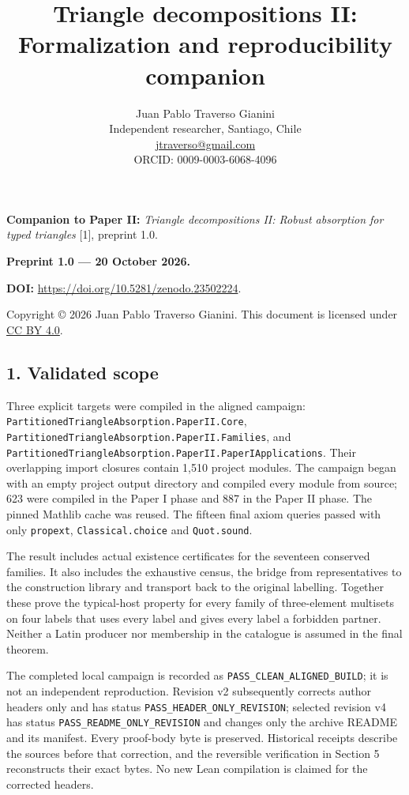 \documentclass[english,11pt,a4paper]{article}
\title{Triangle decompositions II: Formalization and reproducibility companion}
\author{Juan Pablo Traverso Gianini\\
\small Independent researcher, Santiago, Chile\\
\small \href{mailto:jtraverso@gmail.com}{jtraverso@gmail.com}\\
\small ORCID: 0009-0003-6068-4096}
\date{}
\begin{document}
\raggedbottom
\maketitle
\textbf{Companion to Paper II:} \emph{Triangle decompositions II: Robust absorption for typed triangles} {[}1{]}, preprint 1.0.

\textbf{Preprint 1.0 --- 20 October 2026.}

\textbf{DOI:} \url{https://doi.org/10.5281/zenodo.23502224}.

Copyright © 2026 Juan Pablo Traverso Gianini. This document is licensed under \href{https://creativecommons.org/licenses/by/4.0/}{CC BY 4.0}.

\subsection{1. Validated scope}\label{validated-scope}

Three explicit targets were compiled in the aligned campaign: \texttt{Partitioned\allowbreak{}T\allowbreak{}riangle\allowbreak{}Absor\allowbreak{}ption.\allowbreak{}Paper\allowbreak{}I\allowbreak{}I.\allowbreak{}Core}, \texttt{Partitioned\allowbreak{}T\allowbreak{}riangle\allowbreak{}Absor\allowbreak{}ption.\allowbreak{}Paper\allowbreak{}I\allowbreak{}I.\allowbreak{}Families}, and \texttt{Partitioned\allowbreak{}T\allowbreak{}riangle\allowbreak{}Absor\allowbreak{}ption.\allowbreak{}Paper\allowbreak{}I\allowbreak{}I.\allowbreak{}Paper\allowbreak{}IAppl\allowbreak{}ications}. Their overlapping import closures contain 1,510 project modules. The campaign began with an empty project output directory and compiled every module from source; 623 were compiled in the Paper I phase and 887 in the Paper II phase. The pinned Mathlib cache was reused. The fifteen final axiom queries passed with only \texttt{propext}, \texttt{Classical.\allowbreak{}ch\allowbreak{}oice} and \texttt{Quot.\allowbreak{}sound}.

The result includes actual existence certificates for the seventeen conserved families. It also includes the exhaustive census, the bridge from representatives to the construction library and transport back to the original labelling. Together these prove the typical-host property for every family of three-element multisets on four labels that uses every label and gives every label a forbidden partner. Neither a Latin producer nor membership in the catalogue is assumed in the final theorem.

The completed local campaign is recorded as \texttt{PASS\_\allowbreak{}CLEAN\_\allowbreak{}A\allowbreak{}LIGNED\_\allowbreak{}BUILD\allowbreak{}}; it is not an independent reproduction. Revision v2 subsequently corrects author headers only and has status \texttt{PASS\_\allowbreak{}HEADER\_\allowbreak{}\allowbreak{}ONLY\_\allowbreak{}REVISIO\allowbreak{}N}; selected revision v4 has status \texttt{PASS\_\allowbreak{}README\_\allowbreak{}\allowbreak{}ONLY\_\allowbreak{}REVISIO\allowbreak{}N} and changes only the archive README and its manifest. Every proof-body byte is preserved. Historical receipts describe the sources before that correction, and the reversible verification in Section 5 reconstructs their exact bytes. No new Lean compilation is claimed for the corrected headers.
\end{document}
